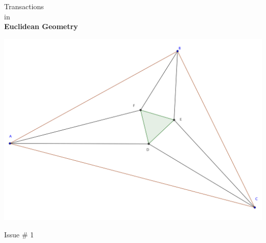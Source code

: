 \documentclass{report}
\begin{document}
\thispagestyle{empty}
\begin{center}
{\Huge Transactions\\ in\\ \textbf{Euclidean Geometry}}

\vspace{1in}

\includegraphics[width=1.1\textwidth]{cover-image.png}



\vfill
{\Huge Issue \# 1}
\end{center}
\end{document}
